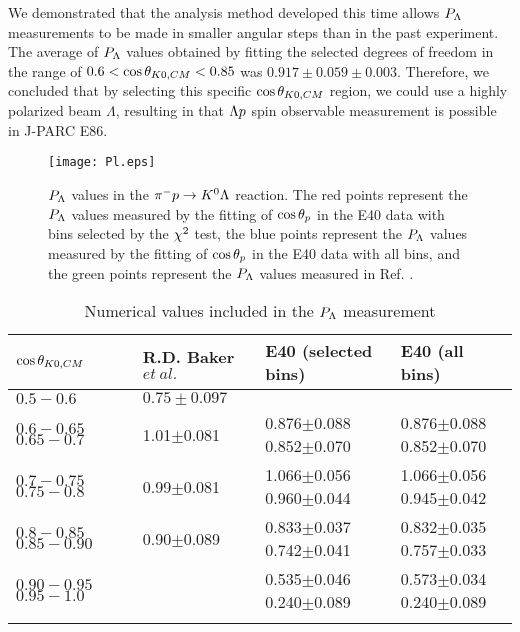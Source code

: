 We demonstrated that the analysis method developed this time allows $P_{\Lambda}$ measurements to be made in smaller angular steps than in the past experiment. The average of $P_{\Lambda}$ values obtained by fitting the selected degrees of freedom in the range of $0.6<\cos{\theta_{K0,CM}}<0.85$ was $0.917\pm0.059\pm0.003$. Therefore, we concluded that by selecting this specific $\cos{\theta_{K0,CM}}$ region, we could use a highly polarized beam $\Lambda$, resulting in that $\Lambda p$ spin observable measurement is possible in J-PARC E86.

\begin{figure}[h]
  \centering
  \texttt{[image: Pl.eps]}
  \caption{$P_{\Lambda}$ values in the $\pi^- p \to K^0 \Lambda$ reaction. The red points represent the $P_{\Lambda}$ values measured by the fitting of $\cos{\theta_p}$ in the E40 data with bins selected by the $\chi^{2}$ test, the blue points represent the $P_{\Lambda}$ values measured by the fitting of $\cos{\theta_p}$ in the E40 data with all bins, and the green points represent the $P_{\Lambda}$ values measured in Ref. \cite{Baker}.}
  \label{fig-Pl}
\end{figure}


\begin{table}[!h] 
  \begin{center}
  \caption{Numerical values included in the $P_{\Lambda}$ measurement}
    \begin{tabular}%
    {m{2cm} m{3cm} m{4cm} m{3cm}}
    $\cos{\theta_{K0,CM}}$ & R.D. Baker $et\ al.$ & E40 (selected bins) & E40 (all bins) \\
    \midrule\midrule
    $0.5-0.6$ & $0.75\pm0.097$ & & \\
    \midrule
    $0.6-0.65$ $0.65-0.7$ & 1.01$\pm$0.081 & 0.876$\pm$0.088 0.852$\pm$0.070 & 0.876$\pm$0.088 0.852$\pm$0.070 \\
    \midrule
    $0.7-0.75$ $0.75-0.8$ & 0.99$\pm$0.081 & 1.066$\pm$0.056 0.960$\pm$0.044 & 1.066$\pm$0.056 0.945$\pm$0.042 \\
    \midrule
    $0.8-0.85$ $0.85-0.90$ & 0.90$\pm$0.089 & 0.833$\pm$0.037 0.742$\pm$0.041 & 0.832$\pm$0.035 0.757$\pm$0.033 \\
    \midrule
    $0.90-0.95$ $0.95-1.0$ & & 0.535$\pm$0.046 0.240$\pm$0.089 & 0.573$\pm$0.034 0.240$\pm$0.089 \\
    \label{tab-Pl}
    \end{tabular}
  \end{center}
\end{table}


\clearpage
